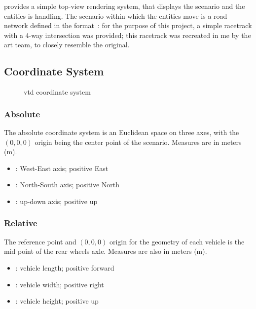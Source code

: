  provides a simple top-view rendering system, that displays the scenario and the entities  is handling. The scenario within which the entities move is a road network defined in the  format~\cite{software:opendrive}: for the purpose of this project, a simple racetrack with a 4-way intersection was provided; this racetrack was recreated in \gls{me} by the art team, to closely resemble the original.

\subsection{Coordinate System} %

\begin{figure}[!ht]
	\FLOATcenter{}

    \caption{\gls{vtd} coordinate system}\label{im:software:vtdcoords}
\end{figure}

\subsubsection{Absolute}

The absolute coordinate system is an Euclidean space on three axes, with the $(0,0,0)$ origin being the center point of the scenario. Measures are in meters (\si{\meter}).

\begin{itemize}
	\item {}: West-East axis; positive East
	\item {}: North-South axis; positive North
	\item {}: up-down axis; positive up
\end{itemize}

\subsubsection{Relative}

The reference point and $(0,0,0)$ origin for the geometry of each vehicle is the mid point of the rear wheels axle. Measures are also in meters (\si{\meter}).

\begin{itemize}
	\item {}: vehicle length; positive forward
	\item {}: vehicle width; positive right
	\item {}: vehicle height; positive up
\end{itemize}

